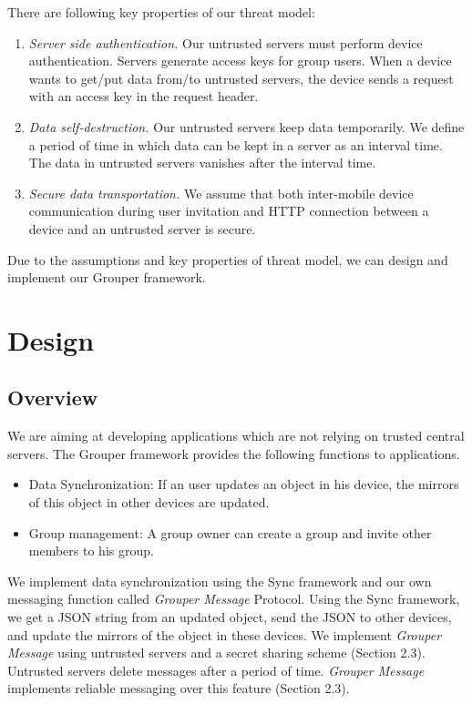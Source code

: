 \documentclass[twocolumn,10pt]{article}
\begin{document}
There are following key properties of our threat model:

\begin{enumerate}
	\setlength{\itemsep}{1pt}
	\setlength{\parskip}{0pt}
	\setlength{\parsep}{0pt}
	\item \emph{Server side authentication.}
	Our untrusted servers must perform device authentication. 
	Servers generate access keys for group users. 
	When a device wants to get/put data from/to untrusted servers, the device sends a request with an access key in the request header.
	\item \emph{Data self-destruction.} 
	Our untrusted servers keep data temporarily.
	We define a period of time in which data can be kept in a server as an interval time. 
	The data in untrusted servers vanishes after the interval time.
	\item \emph{Secure data transportation.}
	We assume that both inter-mobile device communication during user invitation and HTTP connection between a device and an untrusted server is secure. 
\end{enumerate}

Due to the assumptions and key properties of threat model, we can design and implement our Grouper framework.

\section{Design}

\subsection{Overview}

We are aiming at developing applications which are not relying on trusted central servers. 
The Grouper framework provides the following functions to applications.

\begin{itemize}
	\setlength{\itemsep}{1pt}
	\setlength{\parskip}{0pt}
	\setlength{\parsep}{0pt}
	\item Data Synchronization: If an user updates an object in his device, the mirrors of this object in other devices are updated.
	\item Group management: A group owner can create a group and invite other members to his group.
\end{itemize}

We implement data synchronization using the Sync framework\cite{sync} and our own messaging function called \emph{Grouper Message} Protocol.
Using the Sync framework, we get a JSON string from an updated object, send the JSON to other devices, and update the mirrors of the object in these devices. 
We implement \emph{Grouper Message} using untrusted servers and a secret sharing scheme  (Section 2.3). 
Untrusted servers delete messages after a period of time. 
\emph{Grouper Message} implements reliable messaging over this feature (Section 2.3).
\end{document}
